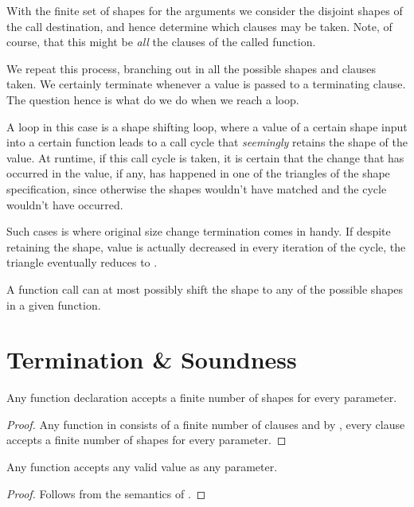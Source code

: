With the finite set of shapes for the arguments we consider the disjoint shapes
of the call destination, and hence determine which clauses may be taken. Note,
of course, that this might be \emph{all} the clauses of the called function.

We repeat this process, branching out in all the possible shapes and clauses
taken. We certainly terminate whenever a value is passed to a terminating
clause. The question hence is what do we do when we reach a loop.

A loop in this case is a shape shifting loop, where a value of a certain shape
input into a certain function leads to a call cycle that \emph{seemingly}
retains the shape of the value. At runtime, if this call cycle is taken, it is
certain that the change that has occurred in the value, if any, has happened in
one of the triangles of the shape specification, since otherwise the shapes
wouldn't have matched and the cycle wouldn't have occurred.

Such cases is where original size change termination comes in handy. If despite
retaining the shape, value is actually decreased in every iteration of the
cycle, the triangle eventually reduces to . 

A function call can at most possibly shift the shape to any of the possible
shapes in a given function.

\section{Termination \& Soundness}

\begin{lemma}\label{lemma:extend-function-finite-shape} Any function
declaration accepts a finite number of shapes for every parameter.\end{lemma}

\begin{proof} Any function in \D{} consists of a finite number of clauses and
by , every clause accepts a finite number of
shapes for every parameter.\end{proof}

\begin{lemma}\label{lemma:extend-any-function-any-value} Any function accepts
any valid \D{} value as any parameter.\end{lemma}

\begin{proof} Follows from the semantics of \D{}.\end{proof}

